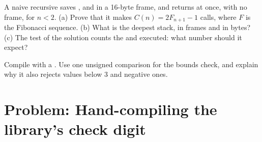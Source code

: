 \begin{exercise}[$\star\star\star$]\label{exo:b2:assembly-and-calling-convention:11}
A naive recursive  saves ,  and  in a 16-byte frame, and returns at once,
with no frame, for $n < 2$. (a) Prove that it makes $C(n) = 2F_{n+1} - 1$ calls, where $F$ is the Fibonacci sequence.
(b) What is the deepest stack, in frames and in bytes? (c) The test of the solution counts the  and
 executed: what number should it expect?
\end{exercise}

\begin{exercise}[$\star\star\star$]\label{exo:b2:assembly-and-calling-convention:12}
Compile with a  .
Use one unsigned comparison for the bounds check, and explain why it also rejects values below 3 and negative ones.
\end{exercise}

\section{Problem: Hand-compiling the library's check digit}\label{sec:b2:assembly-and-calling-convention:problem}

